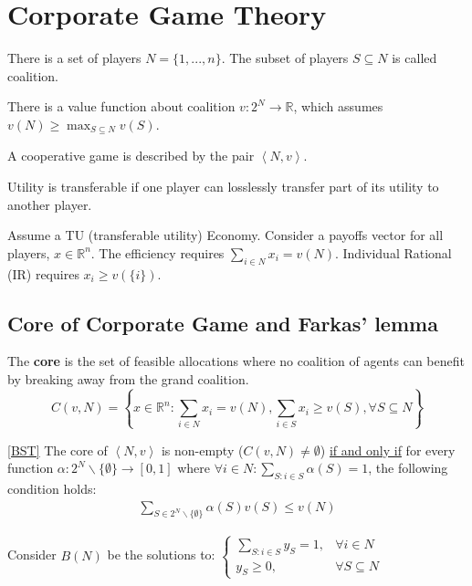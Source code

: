 \documentclass[11pt]{elegantbook}
\begin{document}
\section{Corporate Game Theory}
There is a set of players $N=\{1,...,n\}$. The subset of players $S\subseteq N$ is called coalition.

There is a value function about coalition $v: 2^N \rightarrow \mathbb{R}$, which assumes $v(N)\geq \max_{S\subseteq N}v(S)$.

\begin{definition}
    \normalfont
    A cooperative game is described by the pair $\left<N,v\right>$.
\end{definition}

\begin{definition}
    \normalfont
    Utility is transferable if one player can losslessly transfer part of its utility to another player.
\end{definition}
Assume a TU (transferable utility) Economy. Consider a payoffs vector for all players, $x\in \mathbb{R}^n$. The efficiency requires $\sum_{i\in N}x_i=v(N)$. Individual Rational (IR) requires $x_i\geq v(\{i\})$.

\subsection{Core of Corporate Game and Farkas' lemma}
\begin{definition}[Core]
    \normalfont
    The \textbf{core} is the set of feasible allocations where no coalition of agents can benefit by breaking away from the grand coalition.
    $$C(v,N)=\left\{x\in \mathbb{R}^n: \sum_{i\in N}x_i=v(N), \sum_{i\in S}x_i\geq v(S), \forall S\subseteq N\right\}$$
\end{definition}

\begin{theorem}\ref{BST}
    The core of $\left<N,v\right>$ is non-empty ($C(v,N)\neq \emptyset$) \underline{if and only if} for every function $\alpha: 2^N\backslash\{\emptyset\} \rightarrow [0,1]$ where $\forall i\in N: \sum_{S:i\in S}\alpha(S)=1$, the following condition holds:
    \begin{equation}
        \begin{aligned}
            \sum_{S\in 2^N\backslash\{\emptyset\}}\alpha(S) v(S)\leq v(N)
        \end{aligned}
        \nonumber
    \end{equation}
\end{theorem}
Consider $B(N)$ be the solutions to: $\left\{\begin{matrix}
    \sum_{S:i\in S}y_S=1,&\forall i\in N\\
    y_S\geq 0,& \forall S\subseteq N
\end{matrix}\right.$
\end{document}
